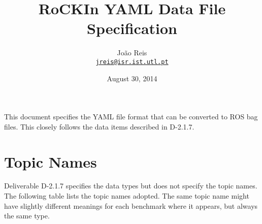 \documentclass[a4paper]{article}
\author{João Reis\\\href{mailto:jreis@isr.ist.utl.pt}{\nolinkurl{jreis@isr.ist.utl.pt}}}
\title{RoCKIn YAML Data File Specification}
\date{August 30, 2014}
\begin{document}
 

\maketitle


This document specifies the YAML file format that can be converted to ROS bag files. This closely follows the data items described in D-2.1.7.


\section{Topic Names}

Deliverable D-2.1.7 specifies the data types but does not specify the topic names. The following table lists the topic names adopted. The same
topic name might have slightly different meanings for each benchmark where it appears, but always the same type.
\end{document}
